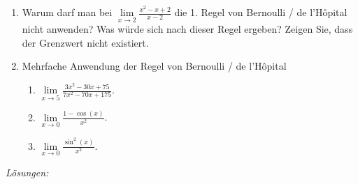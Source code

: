 \begin{ueb}
\begin{enumerate}
    \item Warum darf man bei $\lim\limits_{x \to 2} \frac{x^2 - x + 2}{x - 2}$ die 1. Regel von Bernoulli / de l'Hôpital nicht anwenden?
   Was würde sich nach dieser Regel ergeben? Zeigen Sie, dass der Grenzwert nicht existiert.

    
    
    \item Mehrfache Anwendung der Regel von Bernoulli / de l'Hôpital
    \begin{enumerate}
        \item $\lim\limits_{x \to 5} \frac{3x^2 - 30x + 75}{7x^2 - 70x + 175}$.
        \item $\lim\limits_{x \to 0} \frac{1 - \cos(x)}{x^2}$.
        \item $\lim\limits_{x \to 0} \frac{\sin^2(x)}{x^2}$.
    \end{enumerate}
\end{enumerate}

\end{ueb}
\clearpage
\emph{Lösungen:}

